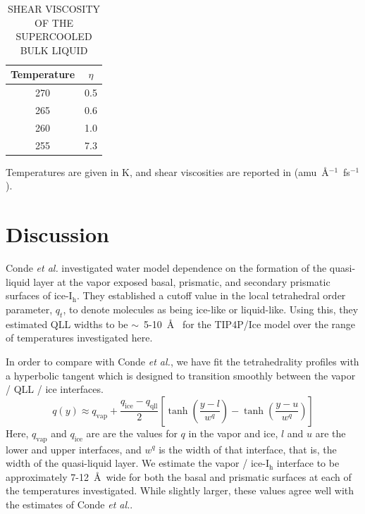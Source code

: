 \begin{table}[h] \centering \caption{SHEAR VISCOSITY OF THE
    SUPERCOOLED BULK LIQUID\label{tab:bulkVisco}}
\begin{tabular}{cc}
\hline
\hline
 Temperature & $\eta$ \\
\hline
270 & 0.5 \\
265 & 0.6 \\
260 & 1.0  \\
255 & 7.3 \\
\hline
\hline
\end{tabular}
\begin{flushleft}
  Temperatures are given in K, and shear viscosities are reported in
  (amu~\AA$^{-1}$~fs$^{-1}$).
\end{flushleft}
\end{table}


\section{Discussion}
Conde \textit{et al.} investigated water model dependence on the
formation of the quasi-liquid layer at the vapor exposed basal,
prismatic, and secondary prismatic surfaces of
ice-I$_\mathrm{h}$.\cite{Conde2008} They established a cutoff value in
the local tetrahedral order parameter, $q_t$, to denote molecules as
being ice-like or liquid-like. Using this, they estimated QLL widths
to be $\sim$~5-10~\AA~ for the TIP4P/Ice model over the range of
temperatures investigated here. 

In order to compare with Conde
\textit{et al.}, we have fit the tetrahedrality profiles with a
hyperbolic tangent which is designed to transition smoothly between
the vapor / QLL / ice interfaces.
\begin{equation}\label{eq:qllFit}
q(y) \approx
q_\mathrm{vap}+\frac{q_\mathrm{ice}-q_\mathrm{qll}}{2}\left[\tanh\left(\frac{y-l}{w^q}\right)-\tanh\left(\frac{y-u}{w^q}\right)\right]
\end{equation}
Here, $q_\mathrm{vap}$ and $q_\mathrm{ice}$ are are the values for $q$
in the vapor and ice, $l$ and $u$ are the lower and upper interfaces,
and $w^q$ is the width of that interface, that is, the width of the
quasi-liquid layer.  We estimate the vapor / ice-I$_\mathrm{h}$
interface to be approximately 7-12~\AA~wide for both the basal and
prismatic surfaces at each of the temperatures investigated. While
slightly larger, these values agree well with the estimates of Conde
\textit{et al.}. 

